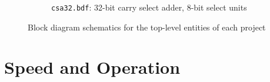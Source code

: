 \documentclass[a4paper,11pt]{article}
\begin{document}
\begin{figure}[!h]
\begin{subfigure}[b]{\textwidth}
		\caption{\texttt{csa32.bdf}: 32-bit carry select adder, 8-bit select units}
		\label{fig:csa32.bdf}
	\end{subfigure}
	\caption{Block diagram schematics for the top-level entities of each project}
	\label{fig:top-level}
\end{figure}

\section{Speed and Operation}
\end{document}
